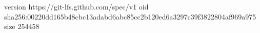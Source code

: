 version https://git-lfs.github.com/spec/v1
oid sha256:00220dd165b48cbc13adabd6abc85cc2b120ed6a3297c39f3822804af969a975
size 254458
